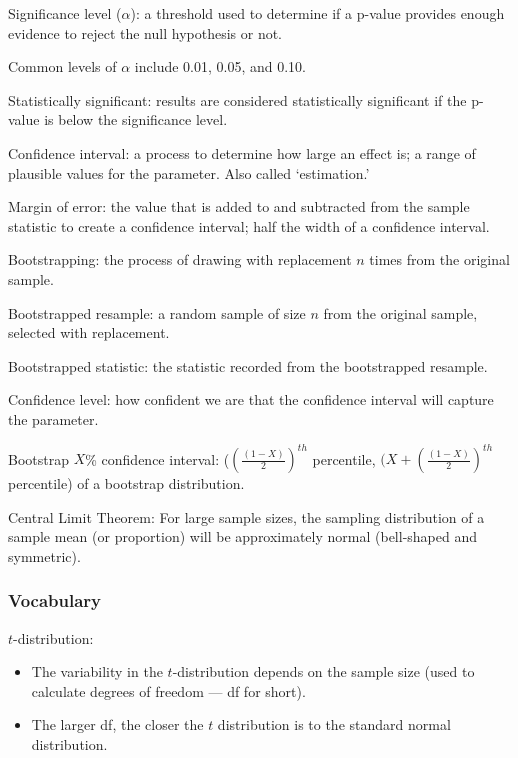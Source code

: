 \documentclass[
]{report}
\newcommand{\rgs}{\vspace{12pt}} %
\newcommand{\rgi}{\hspace{24pt}}  %
\begin{document}
Significance level (\(\alpha\)): a threshold used to determine if a p-value provides enough evidence to reject the null hypothesis or not.

\rgi Common levels of \(\alpha\) include 0.01, 0.05, and 0.10.

Statistically significant: results are considered statistically significant if the p-value is below the significance level.

Confidence interval: a process to determine how large an effect is; a range of plausible values for the parameter. Also called `estimation.'

Margin of error: the value that is added to and subtracted from the sample statistic to create a confidence interval; half the width of a confidence interval.

Bootstrapping: the process of drawing with replacement \(n\) times from the original sample.

Bootstrapped resample: a random sample of size \(n\) from the original sample, selected with replacement.

Bootstrapped statistic: the statistic recorded from the bootstrapped resample.

Confidence level: how confident we are that the confidence interval will capture the parameter.

Bootstrap \(X\)\% confidence interval: (\((\frac{(1-X)}{2})^{th}\) percentile, \((X+(\frac{(1-X)}{2})^{th}\) percentile) of a bootstrap distribution.

Central Limit Theorem: For large sample sizes, the sampling distribution of a sample mean (or proportion) will be approximately normal (bell-shaped and symmetric).

\hypertarget{vocabulary-17}{%
\subsubsection*{Vocabulary}\label{vocabulary-17}}

\(t\)-distribution:
\rgs 

\begin{itemize}
\item
  The variability in the \(t\)-distribution depends on the sample size (used to calculate degrees of freedom --- df for short).
\item
  The larger df, the closer the \(t\) distribution is to the standard normal distribution.
\end{itemize}
\end{document}
